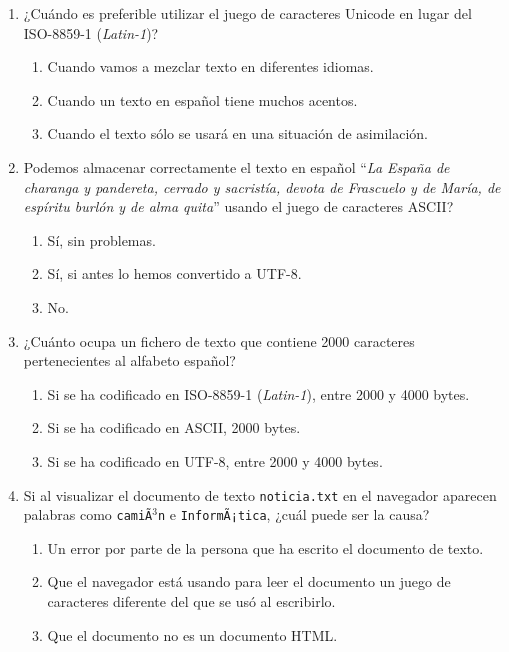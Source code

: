 \begin{enumerate}
\item ¿Cuándo es preferible utilizar el juego de caracteres Unicode en lugar del ISO-8859-1 (\emph{Latin-1})? \begin{enumerate} \item Cuando vamos a mezclar texto en diferentes idiomas. \item Cuando un texto en español tiene muchos acentos. \item Cuando el texto sólo se usará en una situación de asimilación. \end{enumerate} 

\item Podemos almacenar correctamente el texto en español ``\emph{La España de charanga y pandereta, cerrado y sacristía, devota de Frascuelo y de María, de espíritu burlón y de alma quita}'' usando el juego de caracteres ASCII? \begin{enumerate} \item Sí, sin problemas. \item Sí, si antes lo hemos convertido a UTF-8. \item No. \end{enumerate} 

\item ¿Cuánto ocupa un fichero de texto que contiene 2000 caracteres pertenecientes al alfabeto español? \begin{enumerate} \item Si se ha codificado en ISO-8859-1 (\emph{Latin-1}), entre 2000 y 4000 bytes. \item Si se ha codificado en ASCII, 2000 bytes. \item Si se ha codificado en UTF-8, entre 2000 y 4000 bytes. \end{enumerate} 

\item Si al visualizar el documento de texto \texttt{noticia.txt} en el navegador  aparecen palabras como \texttt{camiÃ\(^3\)n} e \texttt{InformÃ¡tica}, ¿cuál  puede ser la causa? \begin{enumerate} \item Un error por parte de la persona que ha escrito el documento de texto. \item Que el navegador está usando para leer el documento un juego de caracteres diferente del que se usó al escribirlo. \item Que el documento no es un documento HTML. \end{enumerate} 

\end{enumerate} 

